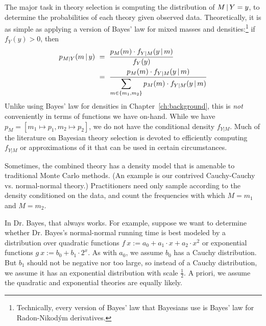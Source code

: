 The major task in theory selection is computing the distribution of $M \,|\, Y = y$, to determine the probabilities of each theory given observed data.
Theoretically, it is as simple as applying a version of Bayes' law for mixed masses and densities:\footnote{Technically, every version of Bayes' law that Bayesians use is Bayes' law for Radon-Nikod\'ym derivatives.} if $f_Y(y) > 0$, then
\begin{equation}
\begin{aligned}
	p_{M|Y}(m \,|\, y)&\ =\ \frac{p_{M}(m) \cdot f_{Y|M}(y \,|\, m)}{f_{Y}(y)}
\\
	&\ =\ \frac{p_{M}(m) \cdot f_{Y|M}(y \,|\, m)}{\displaystyle\sum_{m \in \{{m_1,m_2}\}} p_{M}(m) \cdot f_{Y|M}(y \,|\, m)}
\end{aligned}
\end{equation}
Unlike using Bayes' law for densities in Chapter~\ref{ch:background}, this is \emph{not} conveniently in terms of functions we have on-hand.
While we have $p_M = [m_1 \mapsto p_1, m_2 \mapsto p_2]$, we do not have the conditional density $f_{Y|M}$.
Much of the literature on Bayesian theory selection is devoted to efficiently computing $f_{Y|M}$ or approximations of it that can be used in certain circumstances.

Sometimes, the combined theory has a density model that is amenable to traditional Monte Carlo methods.
(An example is our contrived Cauchy-Cauchy vs. normal-normal theory.)
Practitioners need only sample according to the density conditioned on the data, and count the frequencies with which $M = m_1$ and $M = m_2$.


In Dr. Bayes, that always works.
For example, suppose we want to determine whether Dr. Bayes's normal-normal running time is best modeled by a distribution over quadratic functions $f~x := a_0 + a_1 \cdot x + a_2 \cdot x^2$ or exponential functions $g~x := b_0 + b_1 \cdot 2^x$.
As with $a_0$, we assume $b_0$ has a Cauchy distribution.
But $b_1$ should not be negative nor too large, so instead of a Cauchy distribution, we assume it has an exponential distribution with scale $\tfrac{1}{2}$.
A priori, we assume the quadratic and exponential theories are equally likely.

